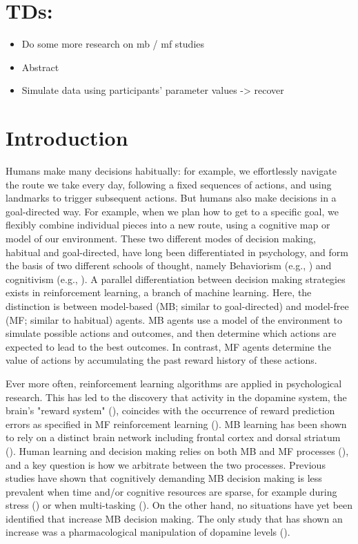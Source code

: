 \documentclass[11pt]{article} %
\begin{document}
\section*{TDs:}
\begin{itemize}
	\item Do some more research on mb / mf studies
	\item Abstract
	\item Simulate data using participants' parameter values -> recover
\end{itemize}

\startmain

\section{Introduction}

Humans make many decisions habitually: for example, we effortlessly navigate the route we take every day, following a fixed sequences of actions, and using landmarks to trigger subsequent actions. But humans also make decisions in a goal-directed way. For example, when we plan how to get to a specific goal, we flexibly combine individual pieces into a new route, using a cognitive map or model of our environment. These two different modes of decision making, habitual and goal-directed, have long been differentiated in psychology, and form the basis of two different schools of thought, namely Behaviorism (e.g., \cite{skinner_why_1977}) and cognitivism (e.g., \cite{tolman_cognitive_1948}). A parallel differentiation between decision making strategies exists in reinforcement learning, a branch of machine learning. Here, the distinction is between model-based (MB; similar to goal-directed) and model-free (MF; similar to habitual) agents. MB agents use a model of the environment to simulate possible actions and outcomes, and then determine which actions are expected to lead to the best outcomes. In contrast, MF agents determine the value of actions by accumulating the past reward history of these actions.

Ever more often, reinforcement learning algorithms are applied in psychological research. This has led to the discovery that activity in the dopamine system, the brain's "reward system" (\cite{wise_brain_1989}), coincides with the occurrence of reward prediction errors as specified in MF reinforcement learning (\cite{schultz_neural_1997}). MB learning has been shown to rely on a distinct brain network including frontal cortex and dorsal striatum (\cite{dolan_goals_2013}). Human learning and decision making relies on both MB and MF processes (\cite{daw_model-based_2011}), and a key question is how we arbitrate between the two processes. Previous studies have shown that cognitively demanding MB decision making is less prevalent when time and/or cognitive resources are sparse, for example during stress (\cite{schwabe_stress-induced_2011}) or when multi-tasking (\cite{otto_curse_2013}). On the other hand, no situations have yet been identified that increase MB decision making. The only study that has shown an increase was a pharmacological manipulation of dopamine levels (\cite{wunderlich_dopamine_2012}). 
\end{document}
